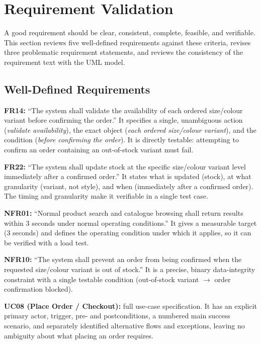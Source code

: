 \documentclass[11pt,a4paper,oneside]{extreport}
\begin{document}
\section{Requirement Validation}
\label{sec:validation}
A good requirement should be clear, consistent, complete, feasible, and verifiable. This section reviews five well-defined requirements against these criteria, revises three problematic requirement statements, and reviews the consistency of the requirement text with the UML model.

\subsection{Well-Defined Requirements}
\textbf{FR14:} ``The system shall validate the availability of each ordered size/colour variant before confirming the order.''\newline
It specifies a single, unambiguous action (\emph{validate availability}), the exact object (\emph{each ordered size/colour variant}), and the condition (\emph{before confirming the order}). It is directly testable: attempting to confirm an order containing an out-of-stock variant must fail.

\textbf{FR22:} ``The system shall update stock at the specific size/colour variant level immediately after a confirmed order.''\newline
It states what is updated (stock), at what granularity (variant, not style), and when (immediately after a confirmed order). The timing and granularity make it verifiable in a single test case.

\textbf{NFR01:} ``Normal product search and catalogue browsing shall return results within 3 seconds under normal operating conditions.''\newline
It gives a measurable target (3 seconds) and defines the operating condition under which it applies, so it can be verified with a load test.

\textbf{NFR10:} ``The system shall prevent an order from being confirmed when the requested size/colour variant is out of stock.''\newline
It is a precise, binary data-integrity constraint with a single testable condition (out-of-stock variant $\rightarrow$ order confirmation blocked).

\textbf{UC08 (Place Order / Checkout):} full use-case specification.\newline
It has an explicit primary actor, trigger, pre- and postconditions, a numbered main success scenario, and separately identified alternative flows and exceptions, leaving no ambiguity about what placing an order requires.
\end{document}
